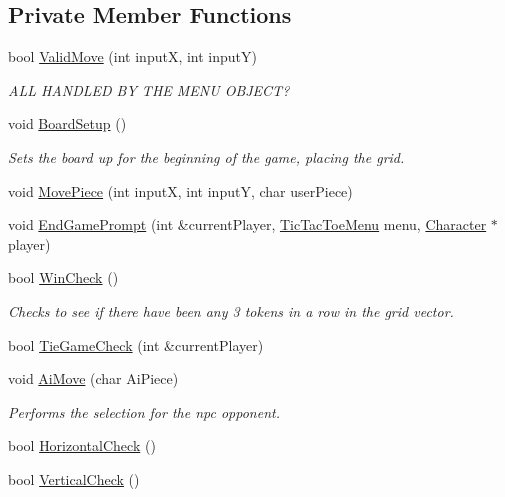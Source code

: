 \subsection*{Private Member Functions}
\begin{DoxyCompactItemize}
\item 
bool \hyperlink{classTicTacToe_ab3e52a3c1bb9fefe08f4c4641f8a70f8}{Valid\-Move} (int input\-X, int input\-Y)
\begin{DoxyCompactList}\small\item\em A\-L\-L H\-A\-N\-D\-L\-E\-D B\-Y T\-H\-E M\-E\-N\-U O\-B\-J\-E\-C\-T? \end{DoxyCompactList}\item 
void \hyperlink{classTicTacToe_a5a03afaffde20d826472e7a8e27995e4}{Board\-Setup} ()
\begin{DoxyCompactList}\small\item\em Sets the board up for the beginning of the game, placing the grid. \end{DoxyCompactList}\item 
void \hyperlink{classTicTacToe_afb236f340525d12a81667a340440b210}{Move\-Piece} (int input\-X, int input\-Y, char user\-Piece)
\item 
void \hyperlink{classTicTacToe_a608d3101cab7340fcc2d0ea5061c37ea}{End\-Game\-Prompt} (int \&current\-Player, \hyperlink{classTicTacToeMenu}{Tic\-Tac\-Toe\-Menu} menu, \hyperlink{classCharacter}{Character} $\ast$player)
\item 
bool \hyperlink{classTicTacToe_afe8f0ecd818f9f6b8418b7e597ff56a7}{Win\-Check} ()
\begin{DoxyCompactList}\small\item\em Checks to see if there have been any 3 tokens in a row in the grid vector. \end{DoxyCompactList}\item 
bool \hyperlink{classTicTacToe_a8134bdddf731a29f61f42273e23f1abf}{Tie\-Game\-Check} (int \&current\-Player)
\item 
void \hyperlink{classTicTacToe_a457647024a551cb3d574d47a9ca85091}{Ai\-Move} (char Ai\-Piece)
\begin{DoxyCompactList}\small\item\em Performs the selection for the npc opponent. \end{DoxyCompactList}\item 
bool \hyperlink{classTicTacToe_afce358eabb849ae0dbf55818a7bdc56b}{Horizontal\-Check} ()
\item 
bool \hyperlink{classTicTacToe_aff214a5737d06961a5f6a14cf97ed1fe}{Vertical\-Check} ()

\end{DoxyCompactItemize}
